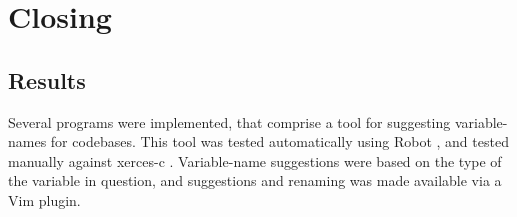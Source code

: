 \chapter{Closing}
\label{chapter:Closing}

\section{Results}
Several programs were implemented, that comprise a tool for suggesting
variable-names for \CC{} codebases. This tool was tested automatically using
Robot \cite{robotframework}, and tested manually against xerces-c
\cite{xerces-c}. Variable-name suggestions were based on the type of the
variable in question, and suggestions and renaming was made available via a Vim
plugin.
